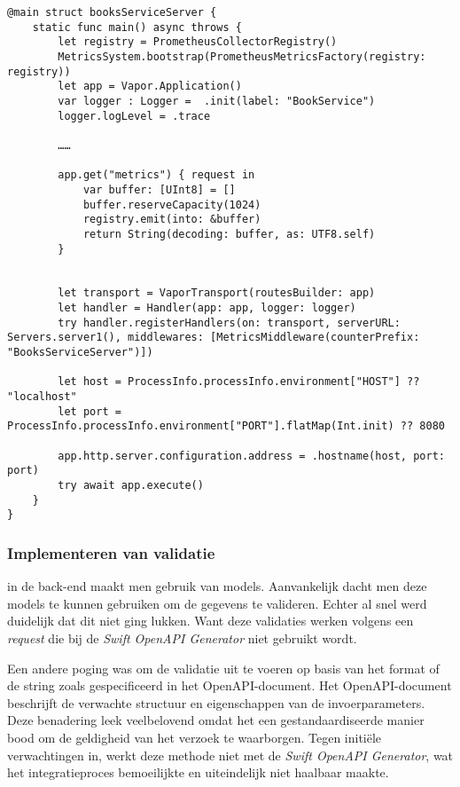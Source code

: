 \begin{lstlisting}[caption=booksServiceServer file]
@main struct booksServiceServer {
    static func main() async throws {
        let registry = PrometheusCollectorRegistry()
        MetricsSystem.bootstrap(PrometheusMetricsFactory(registry: registry))
        let app = Vapor.Application()
        var logger : Logger =  .init(label: "BookService")
        logger.logLevel = .trace
        
        ……
        
        app.get("metrics") { request in
            var buffer: [UInt8] = []
            buffer.reserveCapacity(1024)
            registry.emit(into: &buffer)
            return String(decoding: buffer, as: UTF8.self)
        }
        
        
        let transport = VaporTransport(routesBuilder: app)
        let handler = Handler(app: app, logger: logger)
        try handler.registerHandlers(on: transport, serverURL: Servers.server1(), middlewares: [MetricsMiddleware(counterPrefix: "BooksServiceServer")])
        
        let host = ProcessInfo.processInfo.environment["HOST"] ?? "localhost"
        let port = ProcessInfo.processInfo.environment["PORT"].flatMap(Int.init) ?? 8080
        
        app.http.server.configuration.address = .hostname(host, port: port)
        try await app.execute()
    }
}

\end{lstlisting}

\subsubsection{Implementeren van validatie}
in de back-end maakt men gebruik van models. Aanvankelijk dacht men deze models te kunnen gebruiken om de gegevens te valideren. Echter al snel werd duidelijk dat dit niet ging lukken. Want deze validaties werken volgens een \textit{request} die bij de \textit{Swift OpenAPI Generator} niet gebruikt wordt. 

Een andere poging was om de validatie uit te voeren op basis van het format of de string zoals gespecificeerd in het OpenAPI-document. Het OpenAPI-document beschrijft de verwachte structuur en eigenschappen van de invoerparameters. Deze benadering leek veelbelovend omdat het een gestandaardiseerde manier bood om de geldigheid van het verzoek te waarborgen. Tegen initiële verwachtingen in, werkt deze methode niet met de \textit{Swift OpenAPI Generator}, wat het integratieproces bemoeilijkte en uiteindelijk niet haalbaar maakte.

